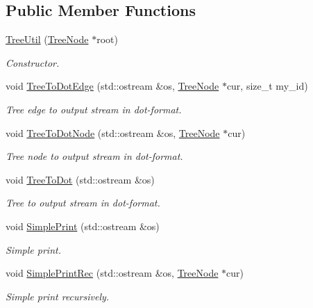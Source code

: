 \subsection*{Public Member Functions}
\begin{DoxyCompactItemize}
\item 
\hyperlink{classTreeUtil_a5e1dfba5f1f3574c2cc73720d3569fe2}{Tree\+Util} (\hyperlink{structTreeNode}{Tree\+Node} $\ast$root)
\begin{DoxyCompactList}\small\item\em Constructor. \end{DoxyCompactList}\item 
void \hyperlink{classTreeUtil_ac7dffdfd7262dd5451b85c5089ece102}{Tree\+To\+Dot\+Edge} (std\+::ostream \&os, \hyperlink{structTreeNode}{Tree\+Node} $\ast$cur, size\+\_\+t my\+\_\+id)
\begin{DoxyCompactList}\small\item\em Tree edge to output stream in dot-\/format. \end{DoxyCompactList}\item 
void \hyperlink{classTreeUtil_aa39fa77d519ea3449e35fcaa73a2230b}{Tree\+To\+Dot\+Node} (std\+::ostream \&os, \hyperlink{structTreeNode}{Tree\+Node} $\ast$cur)
\begin{DoxyCompactList}\small\item\em Tree node to output stream in dot-\/format. \end{DoxyCompactList}\item 
void \hyperlink{classTreeUtil_a42bc4c25bf0e2aeb12ce35f3e0782ec3}{Tree\+To\+Dot} (std\+::ostream \&os)
\begin{DoxyCompactList}\small\item\em Tree to output stream in dot-\/format. \end{DoxyCompactList}\item 
void \hyperlink{classTreeUtil_af6d09d8d92320373731994e39549dd9e}{Simple\+Print} (std\+::ostream \&os)
\begin{DoxyCompactList}\small\item\em Simple print. \end{DoxyCompactList}\item 
void \hyperlink{classTreeUtil_a0d0a0988dc7036d1000afffcd3477866}{Simple\+Print\+Rec} (std\+::ostream \&os, \hyperlink{structTreeNode}{Tree\+Node} $\ast$cur)
\begin{DoxyCompactList}\small\item\em Simple print recursively. \end{DoxyCompactList}\item 

\end{DoxyCompactItemize}
